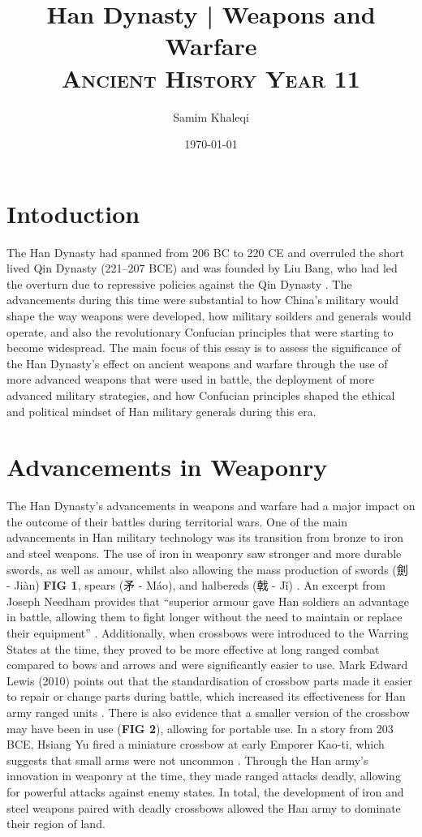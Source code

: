 \documentclass{ctexart}
\title{\Huge{Han Dynasty | Weapons and Warfare}
	\\
\Large\scshape{Ancient History Year 11}}
\author{Samim Khaleqi}
\date{\today}
\begin{document}
\maketitle

\newpage
\tableofcontents
\newpage

\section{Intoduction}
The Han Dynasty had spanned from 206 BC to 220 CE and overruled the short lived Qin Dynasty (221–207 BCE) and was founded by Liu Bang, who had led the overturn due to repressive policies against the Qin Dynasty \cite{theeditorsofencyclopediabritannica_2018_han}. The advancements during this time were substantial to how China’s military would shape the way weapons were developed, how military soilders and generals would operate, and also the revolutionary Confucian principles that were starting to become widespread. The main focus of this essay is to assess the significance of the Han Dynasty’s effect on ancient weapons and warfare through the use of more advanced weapons that were used in battle, the deployment of more advanced military strategies, and how Confucian principles shaped the ethical and political mindset of Han military generals during this era.

\section{Advancements in Weaponry}
The Han Dynasty’s advancements in weapons and warfare had a major impact on the outcome of their battles during territorial wars. One of the main advancements in Han military technology was its transition from bronze to iron and steel weapons. The use of iron in weaponry saw stronger and more durable swords, as well as amour, whilst also allowing the mass production of swords (劍 - Jiàn) \textbf{FIG 1}, spears (矛 - Máo), and halbereds (戟 - Jǐ) \cite{benson_2017_weaponry}. An excerpt from Joseph Needham provides that “superior armour gave Han soldiers an advantage in battle, allowing them to fight longer without the need to maintain or replace their equipment” \cite{needham_1962_science}. Additionally, when crossbows were introduced to the Warring States at the time, they proved to be more effective at long ranged combat compared to bows and arrows and were significantly easier to use. Mark Edward Lewis (2010) points out that the standardisation of crossbow parts made it easier to repair or change parts during battle, which increased its effectiveness for Han army ranged units \cite{markedwardlewis_2010_early}. There is also evidence that a smaller version of the crossbow may have been in use (\textbf{FIG 2}), allowing for portable use. In a story from 203 BCE, Hsiang Yu fired a miniature crossbow at early Emporer Kao-ti, which suggests that small arms were not uncommon \cite{cartwright_2017_crossbows}. Through the Han army’s innovation in weaponry at the time, they made ranged attacks deadly, allowing for powerful attacks against enemy states. In total, the development of iron and steel weapons paired with deadly crossbows allowed the Han army to dominate their region of land.
\end{document}
